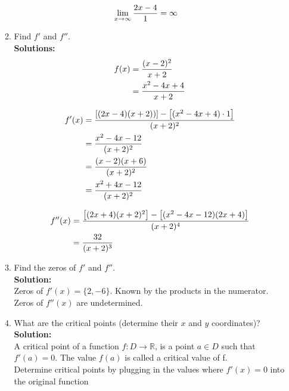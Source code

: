 \documentclass[a4paper]{article}
\begin{document}
\begin{enumerate}
\begin{enumerate}
\begin{align}
	\lim_{x \to \infty} \frac{2x - 4}{1} &= \infty\notag 
\end{align}		
	
	\item Find $f'$ and $f''$.\\
	\textbf{Solutions:}\\
	
\begin{align}
	f(x) &= \frac{(x-2)^2}{x+2}\notag\\
	&= \frac{x^2 - 4x + 4}{x+2}\notag
\end{align}	
	
\begin{align}
	f'(x) &=  \frac{\left[ (2x - 4)(x+2))\right] - \left[ (x^2 - 4x +4) \cdot 1\right]}{(x+2)^2}\notag\\
	&= \frac{x^2 - 4x - 12}{(x+2)^2}\notag\\
	&= \frac{(x-2)(x+6)}{(x+2)^2}\notag\\
	&= \frac{x^2 + 4x - 12}{(x+2)^2}\notag
\end{align}


\begin{align}
	f''(x) &= \frac{\left[(2x+4)(x+2)^2\right] - \left[ (x^2-4x-12)(2x+4)\right]}{(x+2)^4}\notag\\
	&= \frac{32}{(x+2)^3}\notag
\end{align}

	
	
	\item Find the zeros of $f'$ and $f''$.\\
	\textbf{Solution:}\\
	
Zeros of $f'(x) = \{ 2,-6\}$. Known by the products in the numerator.\\

Zeros of $f''(x)$ are undetermined.\\	
	
	
	
	\item What are the critical points (determine their $x$ and $y$ coordinates)?\\
	\textbf{Solution:}\\
	
	
A critical point of a function $f: D \rightarrow \mathbb{R}$, is a point $a \in D$ such that $f'(a) = 0$. The value $f(a)$ is called a critical value of f.\\


Determine critical points by plugging in the values where $f'(x) = 0$ into the original function\\




\end{enumerate}
\end{enumerate}
\end{document}
